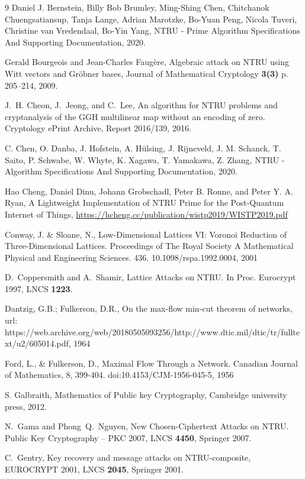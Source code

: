 \documentclass{amsart}
\numberwithin{equation}{section}
\begin{document}
{\begin{thebibliography}{9}
 Daniel J. Bernstein, Billy Bob Brumley,  Ming-Shing Chen, Chitchanok Chuengsatiansup, Tanja Lange, Adrian Marotzke,  Bo-Yuan Peng, Nicola Tuveri, Christine van Vredendaal, Bo-Yin Yang, NTRU - Prime Algorithm Specifications And Supporting Documentation, 2020.

 Gerald Bourgeois and Jean-Charles Faugère, Algebraic attack on NTRU using Witt vectors and Gröbner bases, Journal of Mathematical Cryptology {\bf 3(3)} p. 205--214, 2009.

 J.~H. Cheon, J.~Jeong, and C.~Lee, An algorithm for NTRU problems and cryptanalysis of the GGH multilinear map without an encoding of zero. Cryptology ePrint Archive, Report 2016/139, 2016. 
		
 C. Chen, O. Danba, J.  Hofstein, A. Hülsing, J. Rijneveld, J. M. Schanck, T. Saito, P. Schwabe, W. Whyte, K. Xagawa, T. Yamakawa, Z. Zhang, NTRU - Algorithm Specifications And Supporting Documentation, 2020.

 Hao Cheng, Daniel Dinu, Johann Grobschadl, Peter B. Ronne, and Peter Y. A. Ryan, A Lightweight Implementation of NTRU Prime for the Post-Quantum Internet of Things, \url{https://hcheng.cc/publication/wistp2019/WISTP2019.pdf}

 Conway, J. & Sloane, N., Low-Dimensional Lattices VI: Voronoi Reduction of Three-Dimensional Lattices. Proceedings of The Royal Society A Mathematical Physical and Engineering Sciences. 436. 10.1098/rspa.1992.0004, 2001

  D.~Coppersmith  and  A.~Shamir,  Lattice  Attacks  on  NTRU.  In  Proc.  Eurocrypt  1997, LNCS {\bf 1223}. 

 Dantzig, G.B.; Fulkerson, D.R., On the max-flow min-cut theorem of networks, url: https://web.archive.org/web/20180505093256/http://www.dtic.mil/dtic/tr/fulltext/u2/605014.pdf, 1964

 Ford, L., & Fulkerson, D., Maximal Flow Through a Network. Canadian Journal of Mathematics, 8, 399-404. doi:10.4153/CJM-1956-045-5, 1956
 
 S. Galbraith, Mathematics of Public key Cryptography, Cambridge university press, 2012.
 
 N.~Gama and Phong~Q.~Nguyen, New Chosen-Ciphertext Attacks on NTRU. Public Key Cryptography – PKC 2007, LNCS {\bf 4450}, Springer 2007.

 C.~Gentry, Key recovery and message attacks on NTRU-composite, EUROCRYPT 2001, LNCS {\bf 2045}, Springer 2001.


\end{thebibliography}}
\end{document}
